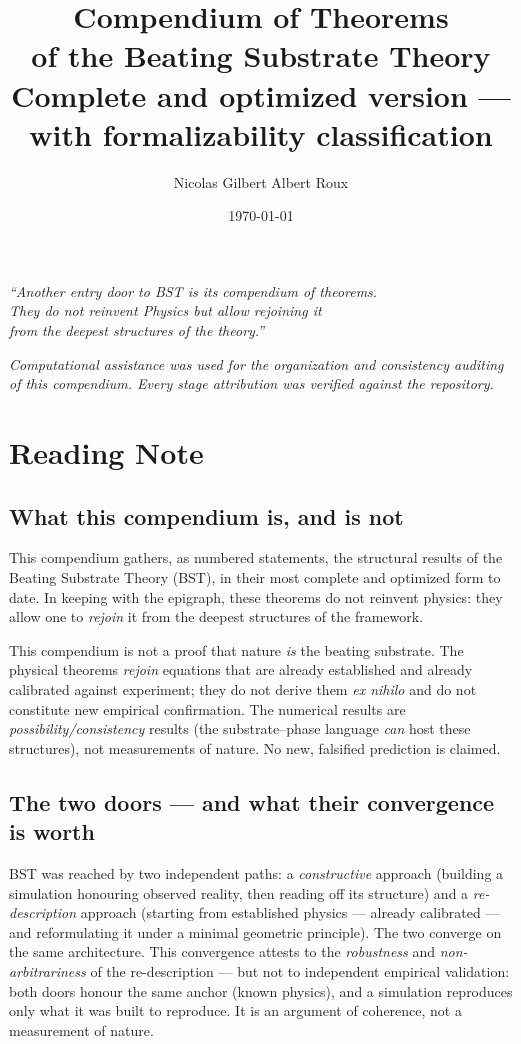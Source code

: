 \documentclass[11pt]{book}
\title{Compendium of Theorems\\[0.4em]\large of the Beating Substrate Theory\\[0.6em]\normalsize Complete and optimized version --- with formalizability classification}
\author{Nicolas Gilbert Albert Roux}
\date{\today}
\begin{document}
\frontmatter
\maketitle

\vspace{1em}
\begin{center}\itshape
``Another entry door to BST is its compendium of theorems.\\
They do not reinvent Physics but allow rejoining it\\
from the deepest structures of the theory.''
\end{center}
\vspace{1em}

\begin{center}\small\itshape Computational assistance was used for the organization and consistency auditing of this compendium. Every stage attribution was verified against the repository.\end{center}

\tableofcontents
\mainmatter

\chapter{Reading Note}

\section{What this compendium is, and is not}
This compendium gathers, as numbered statements, the structural results of the Beating Substrate Theory (BST), in their most complete and optimized form to date. In keeping with the epigraph, these theorems do not reinvent physics: they allow one to \emph{rejoin} it from the deepest structures of the framework.

This compendium is not a proof that nature \emph{is} the beating substrate. The physical theorems \emph{rejoin} equations that are already established and already calibrated against experiment; they do not derive them \emph{ex nihilo} and do not constitute new empirical confirmation. The numerical results are \emph{possibility/consistency} results (the substrate--phase language \emph{can} host these structures), not measurements of nature. No new, falsified prediction is claimed.

\section{The two doors --- and what their convergence is worth}
BST was reached by two independent paths: a \emph{constructive} approach (building a simulation honouring observed reality, then reading off its structure) and a \emph{re-description} approach (starting from established physics --- already calibrated --- and reformulating it under a minimal geometric principle). The two converge on the same architecture. This convergence attests to the \emph{robustness} and \emph{non-arbitrariness} of the re-description --- but not to independent empirical validation: both doors honour the same anchor (known physics), and a simulation reproduces only what it was built to reproduce. It is an argument of coherence, not a measurement of nature.
\end{document}
